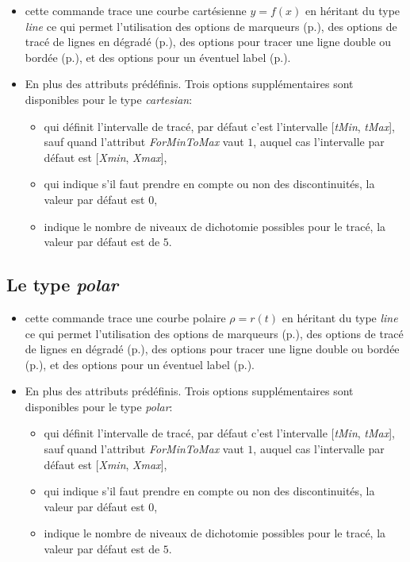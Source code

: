 \begin{itemize}
 \item \desc cette commande trace une courbe cartésienne $y=f(x)$ en héritant du type \emph{line} ce qui permet l'utilisation des options de marqueurs (p.\pageref{marqueurs}), des options de tracé de lignes en dégradé (p.\pageref{gradLines}), des options pour tracer une ligne double ou bordée (p.\pageref{optionsline}), et des options pour un éventuel label (p.\pageref{optionslabels}).
 \item En plus des attributs prédéfinis. Trois options supplémentaires sont disponibles pour le type \emph{cartesian}:\label{cartesian}
  \begin{itemize}
  \item {} qui définit l'intervalle de tracé, par défaut c'est l'intervalle [\emph{tMin}, \emph{tMax}], sauf quand l'attribut \textit{ForMinToMax} vaut $1$, auquel cas l'intervalle par défaut est [\emph{Xmin}, \emph{Xmax}], 
  \item {} qui indique s'il faut prendre en compte ou non des discontinuités, la valeur par défaut est $0$,
  \item {} indique le nombre de niveaux de dichotomie possibles pour le tracé, la valeur par défaut est de $5$.
  \end{itemize}
\end{itemize}

\subsection{Le type \emph{polar}}

{\centering {}\par}

\begin{itemize}
 \item \desc cette commande trace une courbe polaire $\rho=r(t)$ en héritant du type \emph{line} ce qui permet l'utilisation des options de marqueurs (p.\pageref{marqueurs}), des options de tracé de lignes en dégradé (p.\pageref{gradLines}), des options pour tracer une ligne double ou bordée (p.\pageref{optionsline}), et des options pour un éventuel label (p.\pageref{optionslabels}).
 \item En plus des attributs prédéfinis. Trois options supplémentaires sont disponibles pour le type \emph{polar}:\label{polar}
  \begin{itemize}
  \item {} qui définit l'intervalle de tracé, par défaut c'est l'intervalle [\emph{tMin}, \emph{tMax}], sauf quand l'attribut \textit{ForMinToMax} vaut $1$, auquel cas l'intervalle par défaut est [\emph{Xmin}, \emph{Xmax}], 
  \item {} qui indique s'il faut prendre en compte ou non des discontinuités, la valeur par défaut est $0$,
  \item {} indique le nombre de niveaux de dichotomie possibles pour le tracé, la valeur par défaut est de $5$.
  \end{itemize}
\end{itemize}


